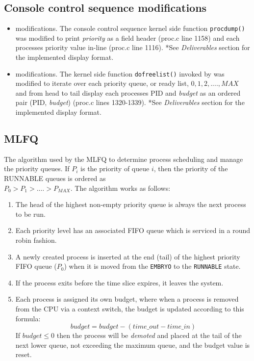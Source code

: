 \documentclass[11pt,letterpaper]{report}
\begin{document}
\begin{itemize}
	\subsection*{Console control sequence modifications}
	\begin{itemize}
		\item {} modifications. The console control sequence  kernel side function {\tt procdump()} was modified to print \emph{priority} as a field header (proc.c line 1158) and each processes priority
	value in-line (proc.c line 1116). *See \emph{Deliverables} section for the implemented display format.
	
		\item {} modifications. The kernel side function {\tt dofreelist()} invoked by  was modified to iterate over each priority queue, or ready list, $0,1,2,....,MAX$ and from head to tail display each processes PID and \emph{budget} as an ordered pair (PID, \emph{budget}) (proc.c lines 1320-1339). *See \emph{Deliverables} section for the implemented display format.
	\end{itemize}
	
				
	\subsection*{MLFQ}
The algorithm used by the MLFQ to determine process scheduling and manage the priority queues. If $P_i$ is the priority of queue $i$, then the priority of the RUNNABLE queues is ordered as \\ $P_0 > P_1 > .\dots > P_{MAX}$. The algorithm works as follows:

\noindent
\begin{enumerate}
\item The head of the highest non-empty priority queue is always the next process to be run.  

\item Each priority level has an associated FIFO queue which is serviced in a round robin fashion.
\item A newly created process is inserted at the end (tail) of the highest priority FIFO queue ($P_0$) when it is moved from the \texttt{EMBRYO} to the \texttt{RUNNABLE} state.
\item If the process exits before the time slice expires, it leaves the system.
\item Each process is assigned its own budget, where when a process is removed from the CPU via a context switch, the budget is updated according to this formula:
\begin{equation*}
budget = budget - (time\_out - time\_in)
\end{equation*}
If $budget \le 0$ then the process will be \emph{demoted} and placed at the tail of the next lower queue, not exceeding the maximum queue, and the budget value is reset.


\end{enumerate}
\end{itemize}
\end{document}
